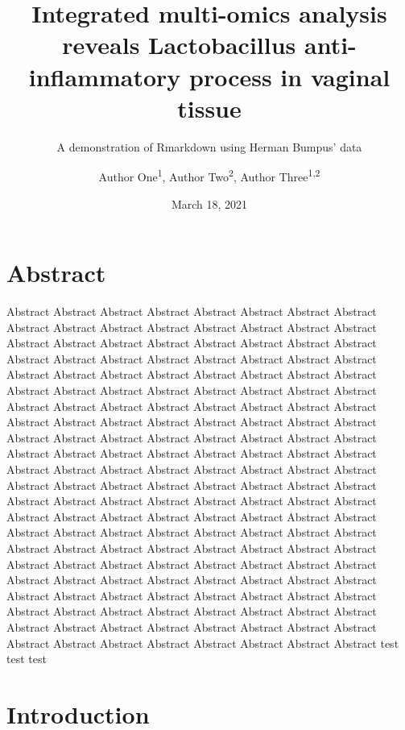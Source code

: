 \documentclass[
]{article}
\title{Integrated multi-omics analysis reveals Lactobacillus anti-inflammatory process in vaginal tissue}
\subtitle{A demonstration of Rmarkdown using Herman Bumpus' data}
\author{Author One\textsuperscript{1},
Author Two\textsuperscript{2},
Author Three\textsuperscript{1,2}}
\date{March 18, 2021}
\begin{document}
\maketitle


\hypertarget{abstract}{%
\section{Abstract}\label{abstract}}

Abstract Abstract Abstract Abstract Abstract Abstract Abstract Abstract Abstract Abstract Abstract Abstract Abstract Abstract Abstract Abstract Abstract Abstract Abstract Abstract Abstract Abstract Abstract Abstract Abstract Abstract Abstract Abstract Abstract Abstract Abstract Abstract Abstract Abstract Abstract Abstract Abstract Abstract Abstract Abstract Abstract Abstract Abstract Abstract Abstract Abstract Abstract Abstract Abstract Abstract Abstract Abstract Abstract Abstract Abstract Abstract Abstract Abstract Abstract Abstract Abstract Abstract Abstract Abstract Abstract Abstract Abstract Abstract Abstract Abstract Abstract Abstract Abstract Abstract Abstract Abstract Abstract Abstract Abstract Abstract Abstract Abstract Abstract Abstract Abstract Abstract Abstract Abstract Abstract Abstract Abstract Abstract Abstract Abstract Abstract Abstract Abstract Abstract Abstract Abstract Abstract Abstract Abstract Abstract Abstract Abstract Abstract Abstract Abstract Abstract Abstract Abstract Abstract Abstract Abstract Abstract Abstract Abstract Abstract Abstract Abstract Abstract Abstract Abstract Abstract Abstract Abstract Abstract Abstract Abstract Abstract Abstract Abstract Abstract Abstract Abstract Abstract Abstract Abstract Abstract Abstract Abstract Abstract Abstract Abstract Abstract Abstract Abstract Abstract Abstract Abstract Abstract Abstract Abstract Abstract Abstract Abstract Abstract Abstract Abstract Abstract Abstract Abstract Abstract Abstract Abstract Abstract Abstract Abstract Abstract Abstract Abstract Abstract Abstract Abstract Abstract
test test test

\clearpage

\hypertarget{introduction}{%
\section{Introduction}\label{introduction}}
\end{document}
